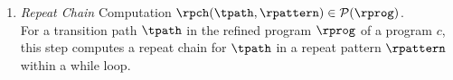   \begin{enumerate}
\item \emph{Repeat Chain} Computation $\rpch(\tpath, \rpattern) \in \mathcal{P}(\rprog)$.
\\
For a transition path $\tpath$ in the refined program $\rprog$ of a program $c$, 
this step computes a repeat chain for $\tpath$ in a repeat pattern $\rpattern$
within a while loop.

\end{enumerate}

